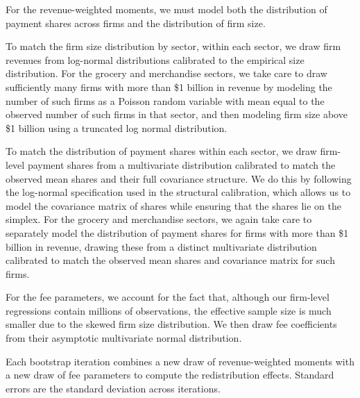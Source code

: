 \documentclass[main.tex]{subfiles}
\begin{document}
For the revenue-weighted moments, we must model both the distribution of payment shares across firms and the distribution of firm size.

To match the firm size distribution by sector, within each sector, we draw firm revenues from log-normal distributions calibrated to the empirical size distribution.
For the grocery and merchandise sectors, we take care to draw sufficiently many firms with more than \$1 billion in revenue by modeling the number of such firms as a Poisson random variable with mean equal to the observed number of such firms in that sector, and then modeling firm size above \$1 billion using a truncated log normal distribution.

To match the distribution of payment shares within each sector, we draw firm-level payment shares from a multivariate distribution calibrated to match the observed mean shares and their full covariance structure.
We do this by following the log-normal specification used in the structural calibration, which allows us to model the covariance matrix of shares while ensuring that the shares lie on the simplex.
For the grocery and merchandise sectors, we again take care to separately model the distribution of payment shares for firms with more than \$1 billion in revenue, drawing these from a distinct multivariate distribution calibrated to match the observed mean shares and covariance matrix for such firms.

For the fee parameters, we account for the fact that, although our firm-level regressions contain millions of observations, the effective sample size is much smaller due to the skewed firm size distribution.
We then draw fee coefficients from their asymptotic multivariate normal distribution.

Each bootstrap iteration combines a new draw of revenue-weighted moments with a new draw of fee parameters to compute the redistribution effects.
Standard errors are the standard deviation across iterations.

\clearpage
\end{document}
